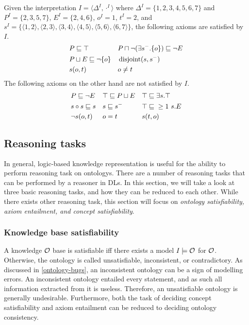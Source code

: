 \begin{example}
  Given the interpretation $I = \langle \Delta^I, \cdot^I \rangle$ where $\Delta^I = \{ 1, 2, 3, 4, 5, 6, 7 \}$ and $P^I = \{ 2, 3, 5, 7 \}$, $E^I = \{ 2, 4, 6 \}$, $o^I = 1$, $t^I = 2$, and $s^I = \{ \langle 1, 2 \rangle,\allowbreak \langle 2, 3 \rangle,\allowbreak \langle 3, 4 \rangle,\allowbreak \langle 4, 5 \rangle,\allowbreak \langle 5, 6 \rangle,\allowbreak \langle 6, 7 \rangle \}$, the following axioms are satisfied by $I$.
  \begin{align*}
    &P \sqsubseteq \top &
    &P \sqcap \lnot (\exists s^-.\{o\}) \sqsubseteq \lnot E \\
    &P \sqcup E \sqsubseteq \lnot \{o\} &
    &\operatorname{disjoint}(s, s^-) \\
    &s(o, t) &
    &o \not= t
  \end{align*}
  The following axioms on the other hand are not satisfied by $I$.
  \begin{align*}
    &P \sqsubseteq \lnot E &
    &\top \sqsubseteq P \sqcup E &
    &\top \sqsubseteq \exists s.\top \\
    &s \circ s \sqsubseteq s &
    &s \sqsubseteq s^- &
    &\top \sqsubseteq{} \geq 1~s.E \\
    &\lnot s(o, t) &
    &o = t &
    &s(t, o)
  \end{align*}
\end{example}

\subsection{Reasoning tasks} \label{reasoning-tasks}

In general, logic-based knowledge representation is useful for the ability to perform reasoning task on ontologys. There are a number of reasoning tasks that can be performed by a reasoner in DLs. In this section, we will take a look at three basic reasoning tasks, and how they can be reduced to each other. While there exists other reasoning task, this section will focus on \emph{ontology satisfiability,} \emph{axiom entailment, and concept satisfiability}.

\subsubsection{Knowledge base satisfiability} \label{knowledge-base-satisfiability}

A knowledge $\mathcal{O}$ base is satisfiable iff there exists a model $I \models \mathcal{O}$ for $\mathcal{O}$. Otherwise, the ontology is called unsatisfiable, inconsistent, or contradictory. As discussed in \cref{ontology-bugs}, an inconsistent ontology can be a sign of modelling errors. An inconsistent ontology entailed every statement, and as such all information extracted from it is useless. Therefore, an unsatisfiable ontology is generally undesirable. Furthermore, both the task of deciding concept satisfiability and axiom entailment can be reduced to deciding ontology consistency.

